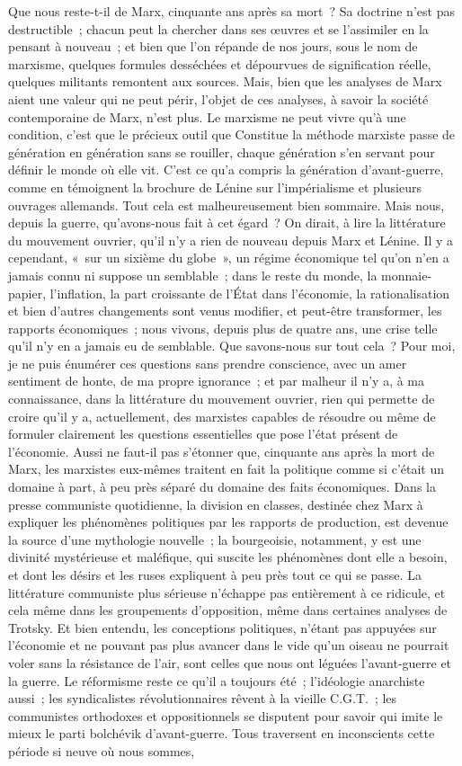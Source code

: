 \documentclass[french,twoside]{book} %
\begin{document}
Que nous reste-t-il de Marx, cinquante ans après sa mort ? Sa doctrine n'est pas destructible ; chacun peut la chercher dans ses œuvres et se l'assimiler en la pensant à nouveau ; et bien que l'on répande de nos jours, sous le nom de marxisme, quelques formules desséchées et dépourvues de signification réelle, quelques militants remontent aux sources. Mais, bien que les analyses de Marx aient une valeur qui ne peut périr, l'objet de ces analyses, à savoir la société contemporaine de Marx, n'est plus. Le marxisme ne peut vivre qu'à une condition, c'est que le précieux outil que Constitue la méthode marxiste passe de génération en génération sans se rouiller, chaque génération s'en servant pour définir le monde où elle vit. C'est ce qu'a compris la génération d'avant-guerre, comme en témoignent la brochure de Lénine sur l'impérialisme et plusieurs ouvrages allemands. Tout cela est malheureusement bien sommaire. Mais nous, depuis la guerre, qu'avons-nous fait à cet égard ? On dirait, à lire la littérature du mouvement ouvrier, qu'il n'y a rien de nouveau depuis Marx et Lénine. Il y a cependant, « sur un sixième du globe », un régime économique tel qu'on n'en a jamais connu ni suppose un semblable ; dans le reste du monde, la monnaie-papier, l'inflation, la part croissante de l'État dans l'économie, la rationalisation et bien d'autres changements sont venus modifier, et peut-être transformer, les rapports économiques ; nous vivons, depuis plus de quatre ans, une crise telle qu'il n'y en a jamais eu de semblable. Que savons-nous sur tout cela ? Pour moi, je ne puis énumérer ces questions sans prendre conscience, avec un amer sentiment de honte, de ma propre ignorance ; et par malheur il n'y a, à ma connaissance, dans la littérature du mouvement ouvrier, rien qui permette de croire qu'il y a, actuellement, des marxistes capables de résoudre ou même de formuler clairement les questions essentielles que pose l'état présent de l'économie. Aussi ne faut-il pas s'étonner que, cinquante ans après la mort de Marx, les marxistes eux-mêmes traitent en fait la politique comme si c'était un domaine à part, à peu près séparé du domaine des faits économiques. Dans la presse communiste quotidienne, la division en classes, destinée chez Marx à expliquer les phénomènes politiques par les rapports de production, est devenue la source d'une mythologie nouvelle ; la bourgeoisie, notamment, y est une divinité mystérieuse et maléfique, qui suscite les phénomènes dont elle a besoin, et dont les désirs et les ruses expliquent à peu près tout ce qui se passe. La littérature communiste plus sérieuse n'échappe pas entièrement à ce ridicule, et cela même dans les groupements d'opposition, même dans certaines analyses de Trotsky. Et bien entendu, les conceptions politiques, n'étant pas appuyées sur l'économie et ne pouvant pas plus avancer dans le vide qu'un oiseau ne pourrait voler sans la résistance de l'air, sont celles que nous ont léguées l'avant-guerre et la guerre. Le réformisme reste ce qu'il a toujours été ; l'idéologie anarchiste aussi ; les syndicalistes révolutionnaires rêvent à la vieille C.G.T. ; les communistes orthodoxes et oppositionnels se disputent pour savoir qui imite le mieux le parti bolchévik d'avant-guerre. Tous traversent en inconscients cette période si neuve où nous sommes, 
\end{document}
